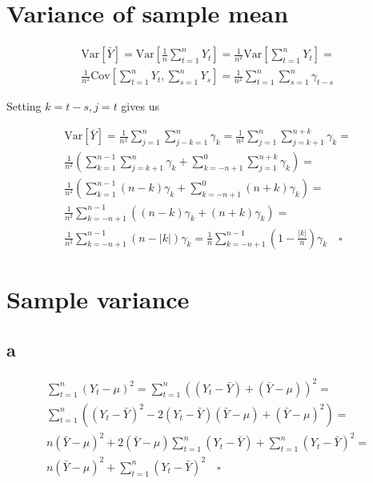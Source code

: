 \documentclass[]{book}
\begin{document}
\section{Variance of sample mean}\label{variance-of-sample-mean}

\begin{gather*}
  \text{Var}[\bar{Y}] = \text{Var}\left[ \frac{1}{n} \sum_{t=1}^n Y_t \right] = \frac{1}{n^2} \text{Var}\left[ \sum_{t=1}^n Y_t \right] = \\
  \frac{1}{n^2}\text{Cov}\left[ \sum_{t=1}^n Y_t, \sum_{s=1}^n Y_s \right] = \frac{1}{n^2} \sum_{t=1}^n \sum_{s=1}^n \gamma_{t-s}
\end{gather*}

Setting \(k = t-s, j = t\) gives us

\begin{gather*}
  \text{Var}[\bar{Y}] = \frac{1}{n^2} \sum_{j=1}^n \sum_{j-k=1}^n \gamma_k = \frac{1}{n^2} \sum_{j=1}^n \sum_{j=k+1}^{n+k} \gamma_k = \\
  \frac{1}{n^2} \left( \sum_{k=1}^{n-1} \sum_{j=k+1}^{n} \gamma_k + \sum_{k=-n+1}^0 \sum_{j=1}^{n+k} \gamma_k \right) = \\
  \frac{1}{n^2} \left( \sum_{k=1}^{n-1} (n-k)\gamma_k + \sum_{k=-n+1}^0 (n+k)\gamma_k \right) = \\
  \frac{1}{n^2} \sum_{k=-n+1}^{n-1} \left( (n-k)\gamma_k + (n+k)\gamma_k \right) = \\
  \frac{1}{n^2} \sum_{k=-n+1}^{n-1} (n-|k|)\gamma_k = \frac{1}{n} \sum_{k=-n+1}^{n-1} \left(1-\frac{|k|}{n}\right)\gamma_k \quad \square
\end{gather*}

\section{Sample variance}\label{sample-variance}

\subsection*{a}\label{a-12}

\begin{gather*}
  \sum_{t=1}^n (Y_t - \mu)^2 = \sum_{t=1}^n((Y_t - \bar{Y}) + (\bar{Y} - \mu))^2 = \\
  \sum_{t=1}^n ((Y_t - \bar{Y})^2 - 2(Y_t - \bar{Y})(\bar{Y}- \mu) + (\bar{Y} - \mu)^2) = \\
  n(\bar{Y} - \mu)^2 + 2(\bar{Y} - \mu)\sum_{t=1}^n (Y_t - \bar{Y}) + \sum_{t=1}^n (Y_t - \bar{Y})^2  = \\
  n(\bar{Y} - \mu)^2 + \sum_{t=1}^n(Y_t - \bar{Y})^2 \quad \square
\end{gather*}
\end{document}
